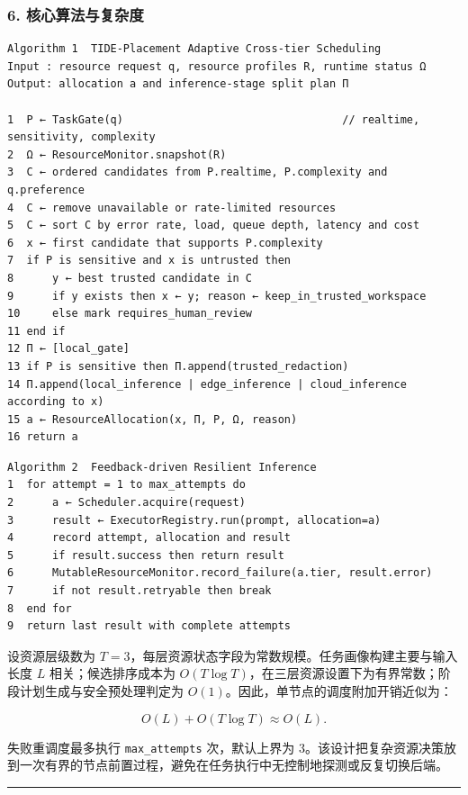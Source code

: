 \documentclass[UTF8,a4paper,12pt]{ctexart}
\begin{document}
\subsubsection{6. 核心算法与复杂度}

\begin{verbatim}
Algorithm 1  TIDE-Placement Adaptive Cross-tier Scheduling
Input : resource request q, resource profiles R, runtime status Ω
Output: allocation a and inference-stage split plan Π

1  P ← TaskGate(q)                                  // realtime, sensitivity, complexity
2  Ω ← ResourceMonitor.snapshot(R)
3  C ← ordered candidates from P.realtime, P.complexity and q.preference
4  C ← remove unavailable or rate-limited resources
5  C ← sort C by error rate, load, queue depth, latency and cost
6  x ← first candidate that supports P.complexity
7  if P is sensitive and x is untrusted then
8      y ← best trusted candidate in C
9      if y exists then x ← y; reason ← keep_in_trusted_workspace
10     else mark requires_human_review
11 end if
12 Π ← [local_gate]
13 if P is sensitive then Π.append(trusted_redaction)
14 Π.append(local_inference | edge_inference | cloud_inference according to x)
15 a ← ResourceAllocation(x, Π, P, Ω, reason)
16 return a
\end{verbatim}

\begin{verbatim}
Algorithm 2  Feedback-driven Resilient Inference
1  for attempt = 1 to max_attempts do
2      a ← Scheduler.acquire(request)
3      result ← ExecutorRegistry.run(prompt, allocation=a)
4      record attempt, allocation and result
5      if result.success then return result
6      MutableResourceMonitor.record_failure(a.tier, result.error)
7      if not result.retryable then break
8  end for
9  return last result with complete attempts
\end{verbatim}

设资源层级数为 \(T=3\)，每层资源状态字段为常数规模。任务画像构建主要与输入长度 \(L\) 相关；候选排序成本为 \(O(T\log T)\)，在三层资源设置下为有界常数；阶段计划生成与安全预处理判定为 \(O(1)\)。因此，单节点的调度附加开销近似为：

\[
O(L)+O(T\log T)\approx O(L).
\]

失败重调度最多执行 \texttt{max\_attempts} 次，默认上界为 3。该设计把复杂资源决策放到一次有界的节点前置过程，避免在任务执行中无控制地探测或反复切换后端。

\begin{center}\rule{0.5\linewidth}{0.5pt}\end{center}
\end{document}
